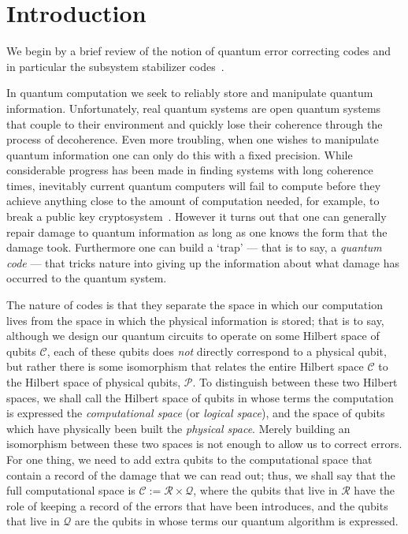 \documentclass[twocolumn,showpacs,preprintnumbers,amsmath,amssymb,nofootinbib,pra,floatfix]{revtex4-1}
\begin{document}
\section{Introduction}

We begin by a brief review of the notion of quantum error correcting codes and in particular the subsystem stabilizer codes~\cite{Poulin:05a}.

In quantum computation we seek to reliably store and manipulate quantum information.  Unfortunately, real quantum systems are open quantum systems that couple to their environment and quickly lose their coherence through the process of decoherence.  Even more troubling, when one wishes to manipulate quantum information one can only do this with a fixed precision.  While considerable progress has been made in finding systems with long coherence times, inevitably current quantum computers will fail to compute before they achieve anything close to the amount of computation needed, for example, to break a public key cryptosystem~\cite{Shor:94a}.  However it turns out that one can generally repair damage to quantum information as long as one knows the form that the damage took.  Furthermore one can build a `trap' --- that is to say, a
\emph{quantum code} --- that tricks nature into giving up the information about what damage has occurred to the quantum system.

The nature of codes is that they separate the space in which our computation lives from the space in which the physical information is
stored; that is to say, although we design our quantum circuits to operate on some Hilbert space of qubits $\mathscr{C}$, each of these qubits
does \emph{not} directly correspond to a physical qubit, but rather there is some isomorphism that relates the entire Hilbert space $\mathscr{C}$
to the Hilbert space of physical qubits, $\mathscr{P}$.  To distinguish between these two Hilbert spaces, we shall call the Hilbert space of qubits in whose terms the computation is expressed the \emph{computational space} (or \emph{logical space}), and the space of qubits which have physically been built the
\emph{physical space}.  Merely building an isomorphism between these two spaces is not enough to allow us to correct errors.  For one thing, we need to add extra qubits to the computational space that contain a record of the damage that we can read out; thus, we shall say that the full computational space is $\mathscr{C}:=\mathscr{R}\times\mathscr{Q}$, where the qubits that live in $\mathscr{R}$ have the role of keeping a
record of the errors that have been introduces, and the qubits that live in $\mathscr{Q}$ are the qubits in whose terms our quantum
algorithm is expressed.  
\end{document}
